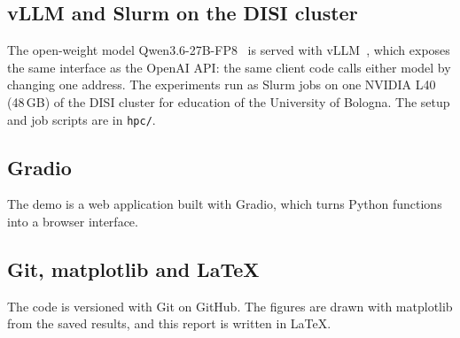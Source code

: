 \subsection{vLLM and Slurm on the DISI cluster}
The open-weight model Qwen3.6-27B-FP8~\citep{qwen2026} is served with vLLM~\citep{kwon2023vllm}, which exposes the same interface as the OpenAI API: the same client code calls either model by changing one address. The experiments run as Slurm jobs on one NVIDIA L40 (48\,GB) of the DISI cluster for education of the University of Bologna. The setup and job scripts are in \texttt{hpc/}.

\subsection{Gradio}
The demo is a web application built with Gradio, which turns Python functions into a browser interface.

\subsection{Git, matplotlib and LaTeX}
The code is versioned with Git on GitHub. The figures are drawn with matplotlib from the saved results, and this report is written in LaTeX.
